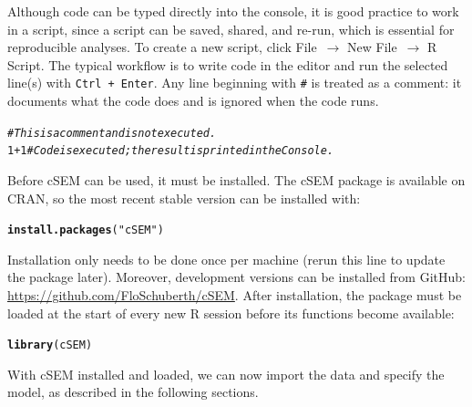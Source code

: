 \documentclass[12pt,a4paper]{article}\usepackage[]{graphicx}\usepackage[]{xcolor}
\makeatletter
\newcommand{\hlnum}[1]{\textcolor[rgb]{0.686,0.059,0.569}{#1}}%
\newcommand{\hlsng}[1]{\textcolor[rgb]{0.192,0.494,0.8}{#1}}%
\newcommand{\hlcom}[1]{\textcolor[rgb]{0.678,0.584,0.686}{\textit{#1}}}%
\newcommand{\hlopt}[1]{\textcolor[rgb]{0,0,0}{#1}}%
\newcommand{\hldef}[1]{\textcolor[rgb]{0.345,0.345,0.345}{#1}}%
\newcommand{\hlkwd}[1]{\textcolor[rgb]{0.737,0.353,0.396}{\textbf{#1}}}%
\newenvironment{kframe}{%
 \def\at@end@of@kframe{}%
 \ifinner\ifhmode%
  \def\at@end@of@kframe{\end{minipage}}%
  \begin{minipage}{\columnwidth}%
 \fi\fi%
 \def\FrameCommand##1{\hskip\@totalleftmargin \hskip-\fboxsep
 \colorbox{shadecolor}{##1}\hskip-\fboxsep
     \hskip-\linewidth \hskip-\@totalleftmargin \hskip\columnwidth}%
 \MakeFramed {\advance\hsize-\width
   \@totalleftmargin\z@ \linewidth\hsize
   \@setminipage}}%
 {\par\unskip\endMakeFramed%
 \at@end@of@kframe}
\newenvironment{knitrout}{}{} %
\newcommand{\pkg}[1]{\textsf{#1}}
\makeatother
\begin{document}
Although code can be typed directly into the console, it is good practice to work in a script, since a script can be saved, shared, and re-run, which is essential for reproducible analyses.
To create a new script, click \textsf{File~$\rightarrow$ New File~$\rightarrow$ R Script}.
The typical workflow is to write code in the editor and run the selected line(s) with \texttt{Ctrl~+~Enter}.
Any line beginning with \texttt{\#} is treated as a comment: it documents what the code does and is ignored when the code runs.

\begin{knitrout}\small
{}\color{fgcolor}\begin{kframe}
\begin{alltt}
\hlcom{# This is a comment and is not executed.}
\hlnum{1} \hlopt{+} \hlnum{1}   \hlcom{# Code is executed; the result is printed in the Console.}
\end{alltt}
\end{kframe}
\end{knitrout}

Before \pkg{cSEM} can be used, it must be installed. The \pkg{cSEM} package is available on CRAN, so the most recent stable version can be installed with:
\begin{knitrout}\small
{}\color{fgcolor}\begin{kframe}
\begin{alltt}
\hlkwd{install.packages}\hldef{(}\hlsng{"cSEM"}\hldef{)}
\end{alltt}
\end{kframe}
\end{knitrout}
Installation only needs to be done once per machine (rerun this line to update the package later).
Moreover, development versions can be installed from GitHub: \url{https://github.com/FloSchuberth/cSEM}.
After installation, the package must be loaded at the start of every new \textsf{R} session before its functions become available:
\begin{knitrout}\small
{}\color{fgcolor}\begin{kframe}
\begin{alltt}
\hlkwd{library}\hldef{(cSEM)}
\end{alltt}
\end{kframe}
\end{knitrout}
With \pkg{cSEM} installed and loaded, we can now import the data and specify the model, as described in the following sections.
\end{document}
